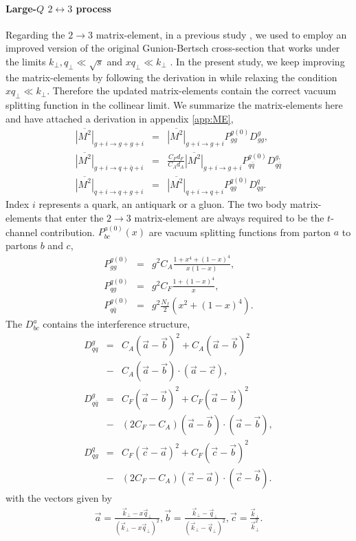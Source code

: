 \paragraph{Large-$Q$ $2\leftrightarrow 3$ process} 
Regarding the $2\rightarrow 3$ matrix-element, in a previous study \cite{Ke:2018tsh}, we used to employ an improved version of the original Gunion-Bertsch cross-section that works under the limits $k_\perp, q_\perp \ll \sqrt{s}$ and $x q_\perp \ll k_\perp$ \cite{PhysRevD.25.746,Fochler:2013epa,Uphoff:2014hza}.
In the present study, we keep improving the matrix-elements by following the derivation in \cite{Fochler:2013epa} while relaxing the condition $x q_\perp \ll k_\perp$.
Therefore the updated matrix-elements contain the correct vacuum splitting function in the collinear limit.
We summarize the matrix-elements here and have attached a derivation in appendix \ref{app:ME},
\begin{eqnarray}
\overline{|M^2|}_{g+i\rightarrow g+g+i} &=& \overline{|M^2|}_{g+i\rightarrow g+i} P_{gg}^{g(0)}  D_{gg}^{g},\\
\overline{|M^2|}_{g+i\rightarrow q+\bar{q}+i} &=& \frac{C_F d_F}{C_A d_A}\overline{|M^2|}_{g+i\rightarrow g+i} P_{q\bar{q}}^{g(0)} D_{q\bar{q}}^{g,}\\
\overline{|M^2|}_{q+i\rightarrow q+g+i} &=& \overline{|M^2|}_{q+i\rightarrow q+i} P_{qg}^{q(0)} D_{qg}^{q}.
\end{eqnarray}
Index $i$ represents a quark, an antiquark or a gluon.
The two body matrix-elements that enter the $2\rightarrow 3$ matrix-element are always required to be the $t$-channel contribution.
$P_{bc}^{a(0)}(x)$ are vacuum splitting functions from parton $a$ to partons $b$ and $c$,
\begin{eqnarray}
P_{gg}^{g(0)}  &=& g^2  C_A\frac{1+x^4+(1-x)^4}{x(1-x)},\\
P_{qg}^{q(0)} &=& g^2  C_F\frac{1+(1-x)^4}{x},\\
P_{q\bar{q}}^{g(0)} &=& g^2  \frac{N_f}{2}\left(x^2+(1-x)^4\right).
\end{eqnarray}
The $D_{bc}^{a}$ contains the interference structure,
\begin{eqnarray}
D_{qq}^{g} &=& 
C_A(\vec{a}-\vec{b})^2 + C_A(\vec{a}-\vec{b})^2 \\\nonumber
&-& C_A (\vec{a}-\vec{b})\cdot (\vec{a}-\vec{c}),
\\
D_{q\bar{q}}^{g} &=& 
C_F(\vec{a}-\vec{b})^2 + C_F(\vec{a}-\vec{b})^2 \\\nonumber
&-& (2C_F-C_A) (\vec{a}-\vec{b})\cdot (\vec{a}-\vec{b}),
\\
D_{qg}^{q} &=& 
C_F(\vec{c}-\vec{a})^2 + C_F(\vec{c}-\vec{b})^2 \\\nonumber
&-& (2C_F-C_A) (\vec{c}-\vec{a})\cdot (\vec{c}-\vec{b}).
\end{eqnarray}
with the vectors given by
\begin{eqnarray}
\vec{a} = \frac{\vec{k}_\perp - x\vec{q}_\perp}{(\vec{k}_\perp - x\vec{q}_\perp)^2},
\vec{b} = \frac{\vec{k}_\perp - \vec{q}_\perp}{(\vec{k}_\perp - \vec{q}_\perp)^2},
\vec{c} =  \frac{\vec{k}_\perp}{\vec{k}_\perp^2}.
\end{eqnarray}

